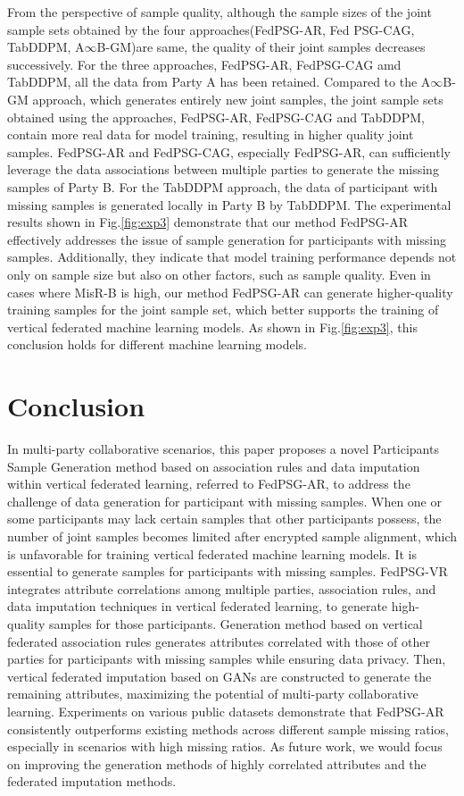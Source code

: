 \documentclass[final,1p,times]{elsarticle}
\begin{document}
 From the perspective of sample quality, although the sample sizes of the joint sample sets obtained by the four approaches(FedPSG-AR, Fed
PSG-CAG, TabDDPM, A$\infty$B-GM)are same, the quality of their joint samples decreases successively. For the three approaches, FedPSG-AR, FedPSG-CAG amd TabDDPM, all the data from Party A has been retained. Compared to the A$\infty$B-GM approach, which generates entirely new joint samples, the joint sample sets obtained using the approaches, FedPSG-AR, FedPSG-CAG and TabDDPM, contain more real data for model training, resulting in higher quality joint samples. FedPSG-AR and FedPSG-CAG, especially FedPSG-AR, can sufficiently leverage the data associations between multiple parties to generate the missing samples of Party B. For the TabDDPM approach, the data of participant with missing samples is generated locally in Party B by TabDDPM. The experimental results shown in Fig.\ref{fig:exp3} demonstrate that our method FedPSG-AR effectively addresses the issue of sample generation for participants with missing samples. Additionally, they indicate that model training performance depends not only on sample size but also on other factors, such as sample quality. Even in cases where MisR-B is high, our method FedPSG-AR can generate higher-quality training samples for the joint sample set, which better supports the training of vertical federated machine learning models. As shown in Fig.\ref{fig:exp3}, this conclusion holds for different machine learning models.

\section{Conclusion}
\label{sec5}
In multi-party collaborative scenarios, this paper proposes a novel Participants Sample Generation method based on association rules and data imputation within vertical federated learning, referred to FedPSG-AR, to address the challenge of data generation for participant with missing samples. When one or some participants may lack certain samples that other participants possess, the number of joint samples becomes limited after encrypted sample alignment, which is unfavorable for training vertical federated machine learning models. It is essential to generate samples for participants with missing samples. FedPSG-VR integrates attribute correlations among multiple parties, association rules, and data imputation techniques in vertical federated learning, to generate high-quality samples for those participants. Generation method based on vertical federated association rules generates attributes correlated with those of other parties for participants with missing samples while ensuring data privacy. Then, vertical federated imputation based on GANs are constructed to generate the remaining attributes, maximizing the potential of multi-party collaborative learning. Experiments on various public datasets demonstrate that FedPSG-AR consistently outperforms existing methods across different sample missing ratios, especially in scenarios with high missing ratios. As future work, we would focus on improving the generation methods of highly correlated attributes and the federated imputation methods.
\end{document}
